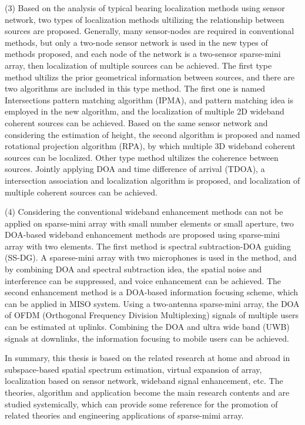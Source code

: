 \begin{ENGabstract}
	(3) Based on the analysis of typical bearing localization methods using sensor network, two types of localization methods ultilizing the relationship between sources are proposed. Generally, many sensor-nodes are required in conventional methods, but only a two-node sensor network is used in the new types of methods proposed, and each node of the network is a two-sensor sparse-mini array, then localization of multiple sources can be achieved. The first type method ultilizs the prior geometrical information between sources, and there are two algorithms are included in this type method. The first one is named Intersections pattern matching algorithm (IPMA), and pattern matching idea is employed in the new algorithm, and the localization of multiple 2D wideband coherent sources can be achieved. Based on the same sensor network and considering the estimation of height, the second algorithm is proposed and named rotational projection algorithm (RPA), by which multiple 3D wideband coherent sources can be localized. Other type method ultilizes the coherence between sources. Jointly applying DOA and time difference of arrival (TDOA), a intersection association and localization algorithm is proposed, and localization of multiple coherent sources can be achieved.


	(4) Considering the conventional wideband enhancement methods can not be applied on sparse-mini array with small number elements or small aperture, two DOA-based wideband enhancement methods are proposed using sparse-mini array with two elements. The first method is spectral subtraction-DOA guiding (SS-DG). A sparese-mini array with two microphones is used in the method, and by combining DOA and spectral subtraction idea, the spatial noise and interference can be suppressed, and voice enhancement can be achieved. The second enhancement method is a DOA-based information focusing scheme, which can be applied in   MISO system. Using a two-antenna sparse-mini array, the DOA of OFDM (Orthogonal Frequency Division Multiplexing) signals of multiple users can be estimated at uplinks. Combining the DOA and ultra wide band (UWB) signals at downlinks, the information focusing to mobile users can be achieved.


	In summary, this thesis is based on the related research at home and abroad in subspace-based spatial spectrum estimation, virtual expansion of array, localization based on sensor network, wideband signal enhancement, etc. The theories, algorithm and application become the main research contents and are studied systemically, which can provide some reference for the promotion of related theories and engineering applications of sparse-mimi array.

\end{ENGabstract}
